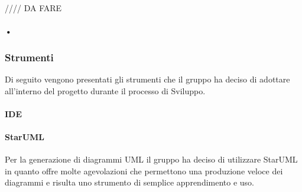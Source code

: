 //// DA FARE

\paragraph{•}

\subsubsection{Strumenti}
Di seguito vengono presentati gli strumenti che il gruppo ha deciso di adottare all'interno del progetto durante il processo di Sviluppo.
\paragraph{IDE}
\paragraph{StarUML}
Per la generazione di diagrammi UML il gruppo ha deciso di utilizzare StarUML in quanto offre molte agevolazioni che permettono una produzione veloce dei diagrammi e risulta uno strumento di semplice apprendimento e uso.

